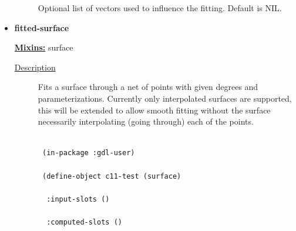 \documentclass [11pt]{book}
\begin{document}
\begin{itemize}
\begin{description}
 Optional list of vectors used to influence the fitting. Default is NIL.




\end{description}







\item {}
\label{prim:fitted-surface}
\textbf{fitted-surface}


\textbf{
\underline{Mixins:}} surface





\begin{description}

\item [
\underline{Description}]


Fits a surface through a net of points with given degrees and parameterizations. Currently
only interpolated surfaces are supported, this will be extended to allow smooth fitting without the surface necessarily
interpolating (going through) each of the points.



\end{description}




\begin{figure}
\begin{lrbox}{\boxedverb}
\begin{minipage}{\linewidth}
{\small

\begin{verbatim}

 (in-package :gdl-user)

 (define-object c11-test (surface) 

  :input-slots () 

  :computed-slots ()


\end{verbatim}}
\end{minipage}
\end{lrbox}
\end{figure}
\end{itemize}
\end{document}
